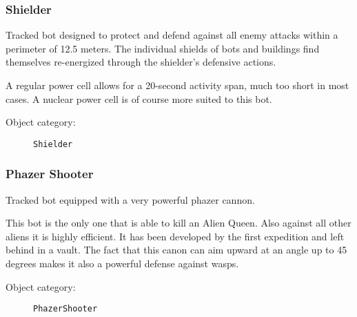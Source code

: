 \subsubsection{Shielder}

Tracked bot designed to protect and defend against all enemy attacks within a perimeter of 12.5 meters. The individual shields of bots and buildings find themselves re-energized through the shielder's defensive actions.

A regular power cell allows for a 20-second activity span, much too short in most cases. A nuclear power cell is of course more suited to this bot.

\begin{description}
    \item[Object category:] \texttt{Shielder}
\end{description}


\subsubsection{Phazer Shooter}

Tracked bot equipped with a very powerful phazer cannon.

This bot is the only one that is able to kill an Alien Queen. Also against all other aliens it is highly efficient. It has been developed by the first expedition and left behind in a vault. The fact that this canon can aim upward at an angle up to 45 degrees makes it also a powerful defense against wasps.

\begin{description}
    \item[Object category:] \texttt{PhazerShooter}
\end{description}